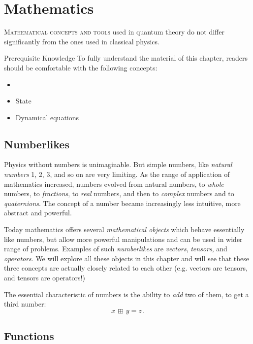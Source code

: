 \graphicspath{{../03Mathematics/pics/}}

\chapter{Mathematics}\label{ch:Mathematics}

\lettrine[lines=2]{\color{darkocre}M}{athematical concepts and tools} used in quantum theory do not differ significantly from the ones used in classical physics.

\begin{myprereq}{Prerequisite Knowledge}
	To fully understand the material of this chapter, readers should be comfortable with the following concepts:
	
	\begin{itemize}
		\item \phantom{phantom}
		\vspace{-0.5cm}
		\item State
		\item Dynamical equations
	\end{itemize}	
\end{myprereq}

\section{Numberlikes}
Physics without numbers is unimaginable. But simple numbers, like \emph{natural numbers} 1, 2, 3, and so on are very limiting.  As the range of application of mathematics increased, numbers evolved from natural numbers, to \emph{whole} numbers, to \emph{fractions}, to \emph{real} numbers, and then to \emph{complex} numbers and to \emph{quaternions}. The concept of a number became increasingly less intuitive, more abstract and powerful.

Today mathematics offers several \emph{mathematical objects} which behave essentially like numbers, but allow more powerful manipulations and can be used in wider range of problems. Examples of such \emph{numberlikes} are \emph{vectors}, \emph{tensors}, and \emph{operators}. We will explore all these objects in this chapter and will see that these three concepts are actually closely related to each other (e.g. vectors are tensors, and tensors are operators!)

The essential characteristic of numbers is the ability to \emph{add} two of them, to get a third number:
\[
x\,\boxplus\, y = z\,.
\]


\section{Functions}

